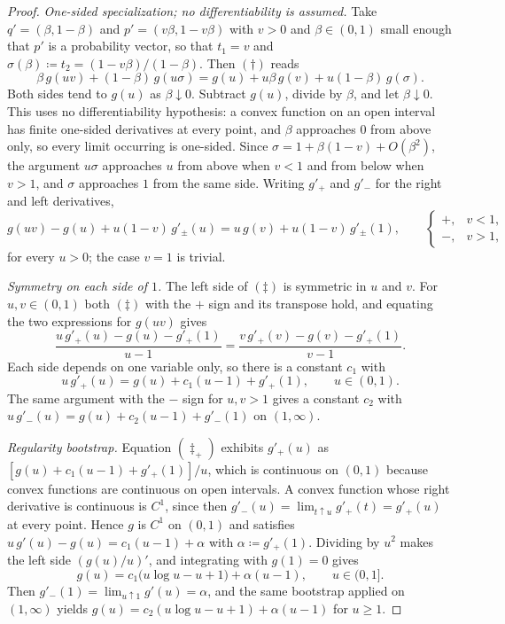 \documentclass[12pt]{article}
\theoremstyle{definition}
\begin{document}
\begin{proof}
\emph{One-sided specialization; no differentiability is assumed.}
Take $q'=(\beta,1-\beta)$ and $p'=(v\beta,1-v\beta)$ with $v>0$ and
$\beta\in(0,1)$ small enough that $p'$ is a probability vector, so that
$t_1=v$ and $\sigma(\beta)\coloneqq t_2=(1-v\beta)/(1-\beta)$.  Then
$(\dagger)$ reads
\[
\beta\,g(uv)+(1-\beta)\,g(u\sigma)
=
g(u)+u\beta\,g(v)+u(1-\beta)\,g(\sigma).
\tag{$\dagger\dagger$}
\]
Both sides tend to $g(u)$ as $\beta\downarrow0$.  Subtract $g(u)$, divide by
$\beta$, and let $\beta\downarrow0$.  This uses no differentiability
hypothesis: a convex function on an open interval has finite one-sided
derivatives at every point, and $\beta$ approaches $0$ from above only, so
every limit occurring is one-sided.  Since
$\sigma=1+\beta(1-v)+O(\beta^2)$, the argument $u\sigma$ approaches $u$ from
above when $v<1$ and from below when $v>1$, and $\sigma$ approaches $1$ from
the same side.  Writing $g'_+$ and $g'_-$ for the right and left derivatives,
\[
g(uv)-g(u)+u(1-v)\,g'_{\pm}(u)
=
u\,g(v)+u(1-v)\,g'_{\pm}(1),
\qquad
\begin{cases}+, & v<1,\\ -, & v>1,\end{cases}
\tag{$\ddagger$}
\]
for every $u>0$; the case $v=1$ is trivial.

\emph{Symmetry on each side of $1$.}  The left side of $(\ddagger)$ is
symmetric in $u$ and $v$.  For $u,v\in(0,1)$ both $(\ddagger)$ with the $+$
sign and its transpose hold, and equating the two expressions for $g(uv)$
gives
\[
\frac{u\,g'_+(u)-g(u)-g'_+(1)}{u-1}
=
\frac{v\,g'_+(v)-g(v)-g'_+(1)}{v-1}.
\]
Each side depends on one variable only, so there is a constant $c_1$ with
\[
u\,g'_+(u)=g(u)+c_1(u-1)+g'_+(1),
\qquad u\in(0,1).
\tag{$\ddagger_+$}
\]
The same argument with the $-$ sign for $u,v>1$ gives a constant $c_2$ with
$u\,g'_-(u)=g(u)+c_2(u-1)+g'_-(1)$ on $(1,\infty)$.

\emph{Regularity bootstrap.}  Equation $(\ddagger_+)$ exhibits $g'_+(u)$ as
$[g(u)+c_1(u-1)+g'_+(1)]/u$, which is continuous on $(0,1)$ because convex
functions are continuous on open intervals.  A convex function whose right
derivative is continuous is $C^1$, since then
$g'_-(u)=\lim_{t\uparrow u}g'_+(t)=g'_+(u)$ at every point.  Hence $g$ is
$C^1$ on $(0,1)$ and satisfies $u\,g'(u)-g(u)=c_1(u-1)+\alpha$ with
$\alpha\coloneqq g'_+(1)$.  Dividing by $u^2$ makes the left side
$(g(u)/u)'$, and integrating with $g(1)=0$ gives
\[
g(u)=c_1\bigl(u\log u-u+1\bigr)+\alpha(u-1),
\qquad u\in(0,1].
\]
Then $g'_-(1)=\lim_{u\uparrow1}g'(u)=\alpha$, and the same bootstrap applied
on $(1,\infty)$ yields
$g(u)=c_2(u\log u-u+1)+\alpha(u-1)$ for $u\ge1$.


\end{proof}
\end{document}
